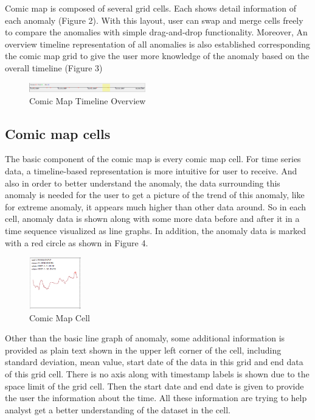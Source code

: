 \documentclass{vgtc}                          %
\begin{document}
Comic map is composed of several grid cells. Each shows detail information of each anomaly (Figure 2). With this layout, user can swap and merge cells freely to compare the anomalies with simple drag-and-drop functionality. Moreover, An overview timeline representation of all anomalies is also established corresponding the comic map grid to give the user more knowledge of the anomaly based on the overall timeline (Figure 3)

 \begin{figure}[htb]
	\centering
  \includegraphics[width=0.45\textwidth]{timeline.png}
  \caption{Comic Map Timeline Overview}
\end{figure}

\subsection{Comic map cells}

The basic component of the comic map is every comic map cell. For time series data, a timeline-based representation is more intuitive for user to receive. And also in order to better understand the anomaly, the data surrounding this anomaly is needed for the user to get a picture of the trend of this anomaly, like for extreme anomaly, it appears much higher than other data around. So in each cell, anomaly data is shown along with some more data before and after it in a time sequence visualized as line graphs. In addition, the anomaly data is marked with a red circle as shown in Figure 4. 

 \begin{figure}[htb]
	\centering
  \includegraphics[width=0.20\textwidth]{onecell.jpg}
  \caption{Comic Map Cell}
\end{figure}

Other than the basic line graph of anomaly, some additional information is provided as plain text shown in the upper left corner of the cell, including standard deviation, mean value, start date of the data in this grid and end data of this grid cell. There is no axis along with timestamp labels is shown due to the space limit of the grid cell. Then the start date and end date is given to provide the user the information about the time. All these information are trying to help analyst get a better understanding of the dataset in the cell.
\end{document}
